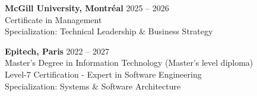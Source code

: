 \documentclass[9pt]{extarticle}
\begin{document}
{\bfseries McGill University, Montréal} \hfill 2025 -- 2026 \\
Certificate in Management \\
Specialization: Technical Leadership \& Business Strategy \\

\vspace{4pt}

{\bfseries Epitech, Paris} \hfill 2022 -- 2027 \\
Master's Degree in Information Technology (Master's level diploma) \\
Level-7 Certification - Expert in Software Engineering \\
Specialization: Systems \& Software Architecture
\end{document}
